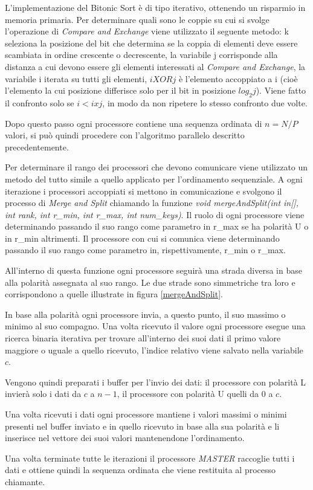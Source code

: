 L'implementazione del Bitonic Sort è di tipo iterativo, ottenendo un risparmio in memoria primaria. Per determinare quali sono le coppie su cui si svolge l'operazione di \textit{Compare and Exchange} viene utilizzato il seguente metodo: k seleziona la posizione del bit che determina se la coppia di elementi deve essere scambiata in ordine crescente o decrescente, la variabile j corrisponde alla distanza a cui devono essere gli elementi interessati al \textit{Compare and Exchange}, la variabile i iterata su tutti gli elementi, $i XOR j$ è l'elemento accoppiato a i (cioè l'elemento la cui posizione differisce solo per il bit in posizione $log_2 j$). Viene fatto il confronto solo se $i < ixj$, in modo da non ripetere lo stesso confronto due volte.

Dopo questo passo ogni processore contiene una sequenza ordinata di $n = N / P$ valori, si può quindi procedere con l'algoritmo parallelo descritto precedentemente. 

Per determinare il rango dei processori che devono comunicare viene utilizzato un metodo del tutto simile a quello applicato per l'ordinamento sequenziale. A ogni iterazione i processori accoppiati si mettono in comunicazione e svolgono il processo di \textit{Merge and Split} chiamando la funzione \textit{void mergeAndSplit(int in[], int rank, int r\_min, int r\_max, int num\_keys)}. Il ruolo di ogni processore viene determinando passando il suo rango come parametro in r\_max se ha polarità U o in r\_min altrimenti. Il processore con cui si comunica viene determinando passando il suo rango come parametro in, rispettivamente, r\_min o r\_max.

All'interno di questa funzione ogni processore seguirà una strada diversa in base alla polarità assegnata al suo rango. Le due strade sono simmetriche tra loro e corrispondono a quelle illustrate in figura \ref{mergeAndSplit}.

In base alla polarità ogni processore invia, a questo punto, il suo massimo o minimo al suo compagno. Una volta ricevuto il valore ogni processore esegue una ricerca binaria iterativa per trovare all'interno dei suoi dati il primo valore maggiore o uguale a quello ricevuto, l'indice relativo viene salvato nella variabile $c$.

Vengono quindi preparati i buffer per l'invio dei dati: il processore con polarità L invierà solo i dati da $c$ a $n - 1$, il processore con polarità U quelli da $0$ a $c$.

Una volta ricevuti i dati ogni processore mantiene i valori massimi o minimi presenti nel buffer inviato e in quello ricevuto in base alla sua polarità e li inserisce nel vettore dei suoi valori mantenendone l'ordinamento.

Una volta terminate tutte le iterazioni il processore \textit{MASTER} raccoglie tutti i dati e ottiene quindi la sequenza ordinata che viene restituita al processo chiamante.
